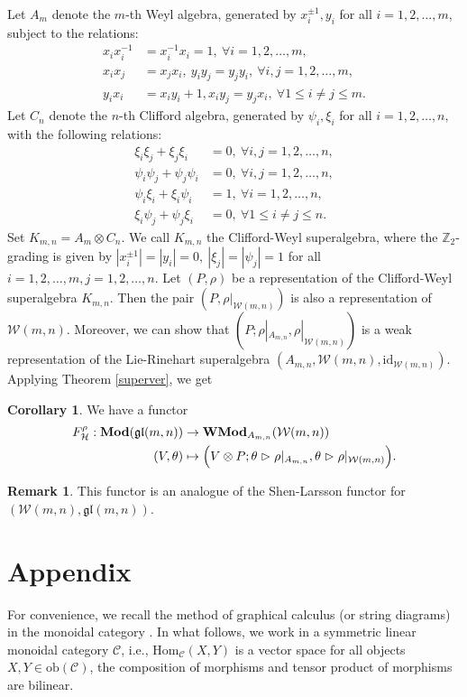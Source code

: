 \documentclass[11pt]{amsart}
\newcommand{\bbZ}{\mathbb{Z}}
\newcommand{\calC}{\mathcal{C}}
\newcommand{\ob}{\mathrm{ob}}
\newcommand{\id}{\mathrm{id}}
\theoremstyle{definition}
\newtheorem{coro}[theo]{Corollary}
\newtheorem{rmk}[theo]{Remark}
\numberwithin{equation}{section}
\begin{document}
Let $A_m$ denote the $m$-th Weyl algebra, generated by $x_i^{\pm 1}, y_i $ for all $i=1,2,\dots, m$, subject to the relations:
\begin{align*}
x_ix_i^{-1}&=x_i^{-1}x_i=1, \ \forall i=1,2,\dots,m,\\
x_ix_j&=x_jx_i, \ y_iy_j=y_jy_i, \ \forall i,j=1,2,\dots,m,\\
y_ix_i&=x_iy_i+1, x_iy_j=y_jx_i,\ \forall 1 \leq i\neq j\leq m.
\end{align*}
Let $C_n$ denote the $n$-th Clifford algebra, generated by $\psi_i,\xi_i $ for all $ i=1,2,\dots,n,$ with the following relations:
\begin{align*}
			\xi_i\xi_j+\xi_j\xi_i&=0, \ \forall i,j=1,2,\dots,n,\\
			\psi_i\psi_j+\psi_j\psi_i&=0, \ \forall i,j=1,2,\dots,n,\\
			\psi_i\xi_i+\xi_i\psi_i&=1, \ \forall i=1,2,\dots,n,\\
			\xi_i\psi_j+\psi_j\xi_i&=0, \ \forall 1 \leq i\neq j \leq n.
\end{align*}
Set $K_{m,n}=A_m\otimes C_n.$ We call $K_{m,n}$ the Clifford-Weyl superalgebra, where the $\bbZ_2$-grading is given by  $|x_{i}^{\pm 1}|=|y_i|=0, \ |\xi_j|=|\psi_j|=1 $ for all $ i=1,2,\dots,m, j=1,2, \dots,n.$
Let $(P,\rho)$ be a representation of the Clifford-Weyl superalgebra $K_{m,n}$. Then the pair $(P,\rho|_{\mathcal{W}(m,n)})$ is also a representation of $\mathcal{W}(m,n)$. Moreover, we can show that $(P;\rho|_{A_{m,n}}, \rho|_{\mathcal{W}(m,n)} )$ is a weak representation of the Lie-Rinehart superalgebra $\left(A_{m,n}, \mathcal{W}(m,n), \id_{\mathcal{W}(m,n)}\right)$.  
Applying Theorem \ref{superver}, we get
\begin{coro}
We have a functor 
\begin{align*}
				F^{\rho}_{\mathcal{H}}: {\bf Mod}(\mathfrak{gl}(m,n)) &\rightarrow {\bf WMod}_{A_{m,n}}(\mathcal{W}(m,n))\\
				(V,\theta) & \mapsto \Big(V\otimes P; \theta\vartriangleright\rho|_{A_{m,n}}, \theta\vartriangleright \rho|_{\mathcal{W}(m,n)} \Big).
\end{align*}
\end{coro}
\begin{rmk}
This functor is an analogue of the Shen-Larsson functor for $(\mathcal{W}(m,n),\mathfrak{gl}(m,n))$.
\end{rmk}

\section{Appendix}
For convenience, we recall the method of graphical calculus (or string diagrams) in the monoidal category \cite{KT95,TV17,Kas95}. In what follows, we work in a symmetric linear monoidal category $\calC$, i.e., $\mathrm{Hom}_{\calC}(X,Y)$ is a vector space for all objects $X,Y\in \ob(\calC)$, the composition of morphisms and tensor product of morphisms are bilinear. 
		
\end{document}
